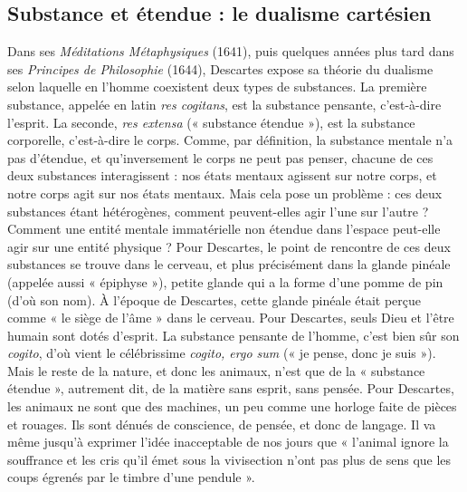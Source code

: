 \subsection{Substance et étendue : le dualisme cartésien}
Dans ses \textit{Méditations Métaphysiques} (1641), puis quelques années plus tard dans ses \textit{Principes de Philosophie} (1644), Descartes expose sa théorie du dualisme selon laquelle en l’homme coexistent deux types de substances. La première substance, appelée en latin \textit{res cogitans}, est la substance pensante, c’est-à-dire l’esprit. La seconde, \textit{res extensa} (« substance étendue »), est la substance corporelle, c’est-à-dire le corps. Comme, par définition, la substance mentale n’a pas d’étendue, et qu’inversement le corps ne peut pas penser, chacune de ces deux substances interagissent : nos états mentaux agissent sur notre corps, et notre corps agit sur nos états mentaux. Mais cela pose un problème : ces deux substances étant hétérogènes, comment peuvent-elles agir l’une sur l’autre ? Comment une entité mentale immatérielle non étendue dans l’espace peut-elle agir sur une entité physique ? Pour Descartes, le point de rencontre de ces deux substances se trouve dans le cerveau, et plus précisément dans la glande pinéale (appelée aussi « épiphyse »), petite glande qui a la forme d’une pomme de pin (d’où son nom). À l’époque de Descartes, cette glande pinéale était perçue comme « le siège de l’âme » dans le cerveau. Pour Descartes, seuls Dieu et l’être humain sont dotés d’esprit. La substance pensante de l’homme, c’est bien sûr son \textit{cogito}, d’où vient le célébrissime \textit{cogito, ergo sum} (« je pense, donc je suis »). Mais le reste de la nature, et donc les animaux, n’est que de la « substance étendue », autrement dit, de la matière sans esprit, sans pensée. Pour Descartes, les animaux ne sont que des machines, un peu comme une horloge faite de pièces et rouages. Ils sont dénués de conscience, de pensée, et donc de langage. Il va même jusqu’à exprimer l’idée inacceptable de nos jours que « l’animal ignore la souffrance et les cris qu’il émet sous la vivisection n’ont pas plus de sens que les coups égrenés par le timbre d’une pendule ».
